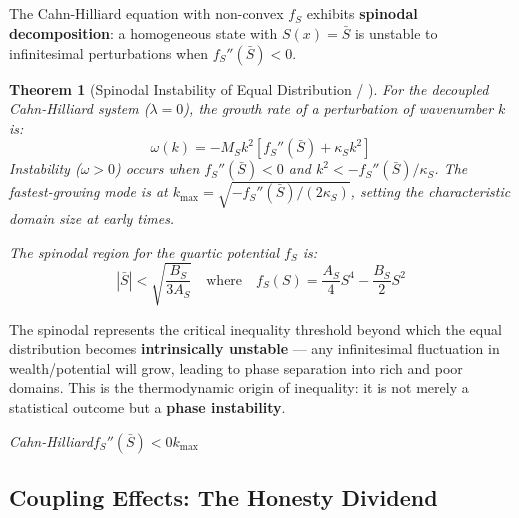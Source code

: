 \documentclass[12pt,a4paper]{article}
\theoremstyle{plain}
\newtheorem{theorem}{ Theorem}[section]
\theoremstyle{definition}
\newcommand{\Sf}{S}                   %
\newcommand{\cn}[1]{\textcolor{scxgray}{\textit{#1}}}
\begin{document}
\subsection*{}

The Cahn-Hilliard equation with non-convex $f_S$ exhibits \textbf{spinodal
decomposition}: a homogeneous state with $\Sf(x)=\bar{\Sf}$ is unstable
to infinitesimal perturbations when $f_S''(\bar{\Sf}) < 0$.

\begin{theorem}[Spinodal Instability of Equal Distribution / ]
\label{thm:spinodal}
For the decoupled Cahn-Hilliard system ($\lambda=0$), the growth rate of
a perturbation of wavenumber $k$ is:
\begin{equation}
    \omega(k) = -M_S k^2 \left[ f_S''(\bar{\Sf}) + \kappa_S k^2 \right]
    \label{eq:dispersion}
\end{equation}
Instability ($\omega>0$) occurs when $f_S''(\bar{\Sf})<0$ and
$k^2 < -f_S''(\bar{\Sf})/\kappa_S$. The fastest-growing mode is at
$k_{\max} = \sqrt{-f_S''(\bar{\Sf})/(2\kappa_S)}$, setting the
characteristic domain size at early times.

The spinodal region for the quartic potential $f_S$ is:
\begin{equation}
    |\bar{\Sf}| < \sqrt{\frac{B_S}{3A_S}}
    \quad \text{where} \quad f_S(\Sf) = \frac{A_S}{4}\Sf^4 - \frac{B_S}{2}\Sf^2
    \label{eq:spinodal_region}
\end{equation}
\end{theorem}

The spinodal represents the critical inequality threshold beyond which
the equal distribution becomes \textbf{intrinsically unstable} — any
infinitesimal fluctuation in wealth/potential will grow, leading to
phase separation into rich and poor domains. This is the thermodynamic
origin of inequality: it is not merely a statistical outcome but a
\textbf{phase instability}.

\bigskip
\noindent
\cn{Cahn-Hilliard$f_S''(\bar{\Sf})<0$$k_{\max}$}

\subsection{Coupling Effects: The Honesty Dividend}
\subsection*{}
\end{document}

